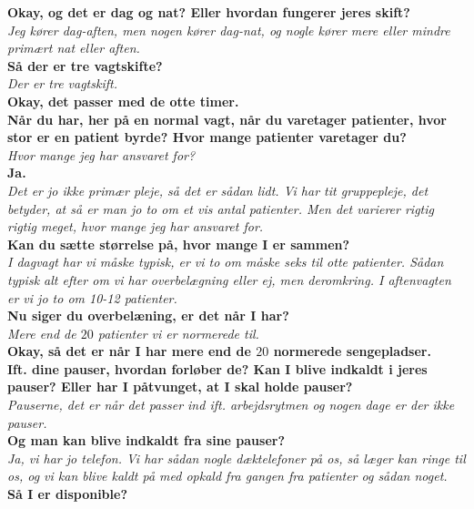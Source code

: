 \noindent
\textbf{Okay, og det er dag og nat? Eller hvordan fungerer jeres skift?} \\
\noindent
\textit{Jeg kører dag-aften, men nogen kører dag-nat, og nogle kører mere eller mindre primært nat eller aften.} \\
\noindent
\textbf{Så der er tre vagtskifte?} \\
\noindent
\textit{Der er tre vagtskift.} \\
\noindent
\textbf{Okay, det passer med de otte timer.} \\
\noindent
\textbf{Når du har, her på en normal vagt, når du varetager patienter, hvor stor er en patient byrde? Hvor mange patienter varetager du?} \\
\noindent
\textit{Hvor mange jeg har ansvaret for?} \\
\noindent
\textbf{Ja.} \\
\noindent
\textit{Det er jo ikke primær pleje, så det er sådan lidt. Vi har tit gruppepleje, det betyder, at så er man jo to om et vis antal patienter. Men det varierer rigtig rigtig meget, hvor mange jeg har ansvaret for.} \\
\noindent
\textbf{Kan du sætte størrelse på, hvor mange I er sammen?} \\
\noindent
\textit{I dagvagt har vi måske typisk, er vi to om måske seks til otte patienter. Sådan typisk alt efter om vi har overbelægning eller ej, men deromkring. I aftenvagten er vi jo to om 10-12 patienter.} \\
\noindent
\textbf{Nu siger du overbelæning, er det når I har?} \\
\noindent
\textit{Mere end de $20$ patienter vi er normerede til.} \\
\noindent
\textbf{Okay, så det er når I har mere end de $20$ normerede sengepladser.} \\
\noindent
\textbf{Ift. dine pauser, hvordan forløber de? Kan I blive indkaldt i jeres pauser? Eller har I påtvunget, at I skal holde pauser?} \\
\noindent
\textit{Pauserne, det er når det passer ind ift. arbejdsrytmen og nogen dage er der ikke pauser.} \\
\noindent
\textbf{Og man kan blive indkaldt fra sine pauser?} \\
\noindent
\textit{Ja, vi har jo telefon. Vi har sådan nogle dæktelefoner på os, så læger kan ringe til os, og vi kan blive kaldt på med opkald fra gangen fra patienter og sådan noget.}\\ 
\noindent
\textbf{Så I er disponible?} \\
